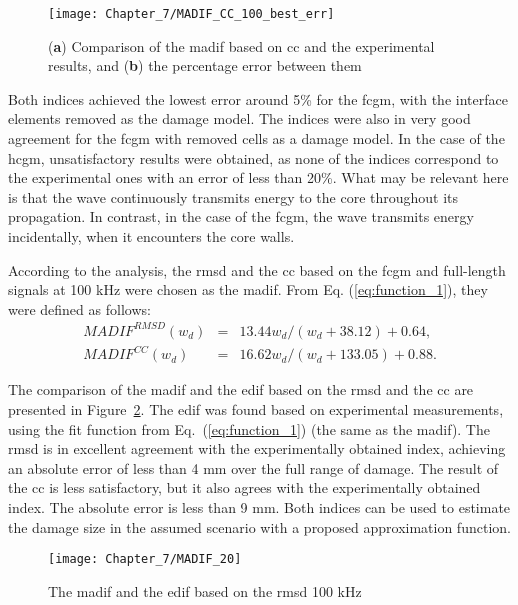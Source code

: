 \begin{figure}[!tbh]
	\begin{center}
		\texttt{[image: Chapter\_7/MADIF\_CC\_100\_best\_err]}
	\end{center}
	\caption{(\textbf{a}) Comparison of the \acf{madif} based on \acf{cc} and the experimental results, and (\textbf{b}) the percentage error between them}
	\label{fig:madif_cc_best}
\end{figure}

Both indices achieved the lowest error around 5\% for the \ac{fcgm}, with the interface elements removed as the damage model.
The indices were also in very good agreement for the \ac{fcgm} with removed cells as a damage model.
In the case of the \ac{hcgm}, unsatisfactory results were obtained, as none of the indices correspond to the experimental ones with an error of less than 20\%.
What may be relevant here is that the wave continuously transmits energy to the core throughout its propagation.
In contrast, in the case of the \ac{fcgm}, the wave transmits energy incidentally, when it encounters the core walls.
\pagebreak

According to the analysis, the \ac{rmsd} and the \ac{cc} based on the \ac{fcgm} and full-length signals at 100 \unit{kHz} were chosen as the \ac{madif}.
From Eq. (\ref{eq:function_1}), they were defined as follows:
\begin{eqnarray}
	MADIF^{RMSD}(w_d) & = & {13.44w_d}/(w_d+38.12)+0.64,
	\label{eq:MADIF_RMSD}\\
	MADIF^{CC}(w_d) & = & 16.62w_d/(w_d+133.05)+0.88.
	\label{eq:MADIF_CC}
\end{eqnarray}

The comparison of the \ac{madif} and the \ac{edif} based on the \ac{rmsd} and the \ac{cc} are presented in Figure~\ref{fig:madif_20}.
The \ac{edif} was found based on experimental measurements, using the fit function from Eq.~(\ref{eq:function_1}) (the same as the \ac{madif}).
The \ac{rmsd} is in excellent agreement with the experimentally obtained index, achieving an absolute error of less than 4 mm over the full range of damage.
The result of the \ac{cc} is less satisfactory, but it also agrees with the experimentally obtained index.
The absolute error is less than 9 mm.
\pagebreak
Both indices can be used to estimate the damage size in the assumed scenario with a proposed approximation function.
\begin{figure}[!tbh]
	\begin{center}
		\texttt{[image: Chapter\_7/MADIF\_20]}
	\end{center}
	\caption{The \acl{madif} and the \acf{edif} based on the \acf{rmsd} 100 \unit{\kHz}}
	\label{fig:madif_20}
\end{figure}
